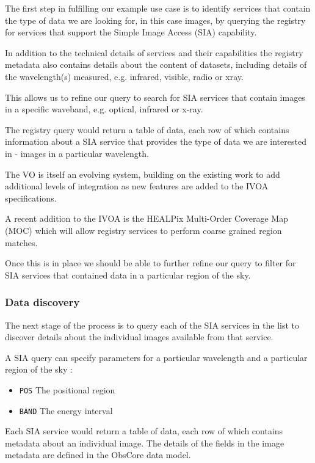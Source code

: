 \documentclass{article}
\begin{document}
The first step in fulfilling our example use case is to identify services that
contain the type of data we are looking for, in this case images, by querying
the registry for services that support the Simple Image Access (SIA)
capability.

In addition to the technical details of services and their capabilities the
registry metadata also contains details about the content of datasets, including
details of the wavelength(s) measured, e.g. infrared, visible, radio or xray.

This allows us to refine our query to search for SIA services that contain
images in a specific waveband, e.g. optical, infrared or x-ray.

The registry query would return a table of data, each row of which contains
information about a SIA service that provides the type of data we are
interested in - images in a particular wavelength.

The VO is itself an evolving system, building on the existing work to add
additional levels of integration as new features are added to the IVOA
specifications.

A recent addition to the IVOA is the HEALPix Multi-Order Coverage Map (MOC)
which will allow registry services to perform coarse grained region matches.

Once this is in place we should be able to further refine our query to filter
for SIA services that contained data in a particular region of the sky.

\subsubsection{Data discovery}

The next stage of the process is to query each of the SIA services in the list
to discover details about the individual images available from that service.

\noindent
A SIA query can specify parameters for a particular wavelength and a particular
region of the sky :
\begin{itemize}
  \item \texttt{POS}  The positional region
  \item \texttt{BAND} The energy interval
\end{itemize}

Each SIA service would return a table of data, each row of which contains
metadata about an individual image. The details of the fields in the
image metadata are defined in the ObsCore
data model.
\end{document}
